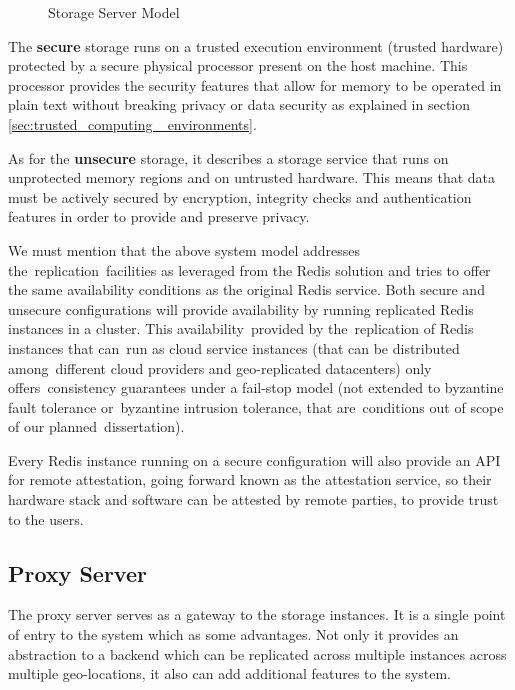 \begin{figure}[htbp]
  \caption{Storage Server Model}
  \label{fig:storage_server_model}
\end{figure}

The \textbf{secure} storage runs on a trusted execution environment (trusted hardware) protected by a secure physical processor present on the host machine. This processor provides the security features that allow for memory to be operated in plain text without breaking privacy or data security as explained in section \ref{sec:trusted_computing _environments}.

As for the \textbf{unsecure} storage, it describes a storage service that runs on unprotected memory regions and on untrusted hardware. This means that data must be actively secured by encryption, integrity checks and authentication features in order to provide and preserve privacy.

We must mention that the above system model addresses the replication facilities as leveraged from the Redis solution and tries to offer the same availability conditions as the original Redis service. Both secure and unsecure configurations will provide availability by running replicated Redis instances in a cluster. This availability provided by the replication of Redis instances that can run as cloud service instances (that can be distributed among different cloud providers and geo-replicated datacenters) only offers consistency guarantees under a fail-stop model (not extended to byzantine fault tolerance or byzantine intrusion tolerance, that are conditions out of scope of our planned dissertation).

Every Redis instance running on a secure configuration will also provide an API for remote attestation, going forward known as the attestation service, so their hardware stack and software can be attested by remote parties, to provide trust to the users.

\subsection{Proxy Server}
\label{ssec:system_model_proxy_server}

The proxy server serves as a gateway to the storage instances. It is a single point of entry to the system which as some advantages. Not only it provides an abstraction to a backend which can be replicated across multiple instances across multiple geo-locations, it also can add additional features to the system. 

